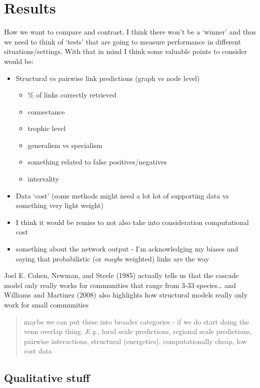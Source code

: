 \documentclass[
  letterpaper,
  DIV=11,
  numbers=noendperiod]{scrartcl}
\providecommand{\tightlist}{%
  \setlength{\itemsep}{0pt}\setlength{\parskip}{0pt}}\usepackage{longtable,booktabs,array}
\begin{document}
\section{Results}\label{results}

How we want to compare and contrast. I think there won't be a `winner'
and thus we need to think of `tests' that are going to measure
performance in different situations/settings. With that in mind I think
some valuable points to consider would be:

\begin{itemize}
\tightlist
\item
  Structural vs pairwise link predictions (graph vs node level)

  \begin{itemize}
  \tightlist
  \item
    \% of links correctly retrieved
  \item
    connectance
  \item
    trophic level
  \item
    generalism vs specialism
  \item
    something related to false positives/negatives
  \item
    intervality
  \end{itemize}
\item
  Data `cost' (some methods might need a lot lot of supporting data vs
  something very light weight)
\item
  I think it would be remiss to not also take into consideration
  computational cost
\item
  something about the network output - I'm acknowledging my biases and
  saying that probabilistic (or \emph{maybe} weighted) links are the way
\end{itemize}

Joel E. Cohen, Newman, and Steele (1985) actually tells us that the
cascade model only really works for communities that range from 3-33
species\ldots{} and Williams and Martinez (2008) also highlights how
structural models really only work for small communities

\begin{quote}
maybe we can put these into broader categories - if we do start doing
the venn overlap thing. \emph{E.g.,} local scale predictions, regional
scale predictions, pairwise interactions, structural (energetics),
computationally cheap, low cost data
\end{quote}

\subsection{Qualitative stuff}\label{qualitative-stuff}
\end{document}
